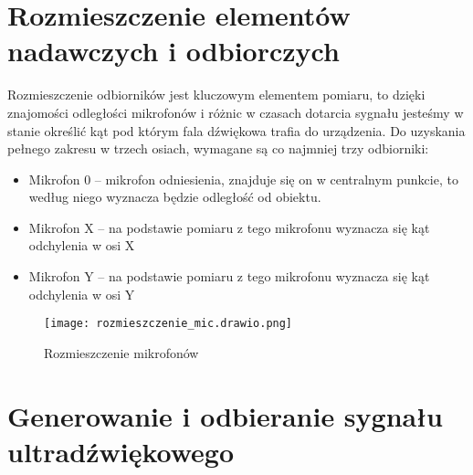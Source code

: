 \section{Rozmieszczenie elementów nadawczych i odbiorczych}
Rozmieszczenie odbiorników jest kluczowym elementem pomiaru, to dzięki znajomości odległości mikrofonów i różnic w czasach 
dotarcia sygnału jesteśmy w stanie określić kąt pod którym fala dźwiękowa trafia do urządzenia. 
Do uzyskania pełnego zakresu w trzech osiach, wymagane są co najmniej trzy odbiorniki:
\begin{itemize}
    \item Mikrofon 0 -- mikrofon odniesienia, znajduje się on w centralnym punkcie, to według niego wyznacza będzie odległość od obiektu.
    \item Mikrofon X -- na podstawie pomiaru z tego mikrofonu wyznacza się kąt odchylenia w osi X 
    \item Mikrofon Y -- na podstawie pomiaru z tego mikrofonu wyznacza się kąt odchylenia w osi Y
\end{itemize}

\begin{figure}[ht!]
    \centering
    \texttt{[image: rozmieszczenie\_mic.drawio.png]}
    \caption{Rozmieszczenie mikrofonów}
    \label{fig:rozmieszczenie_mic}
\end{figure}

\section{Generowanie i odbieranie sygnału ultradźwiękowego}

